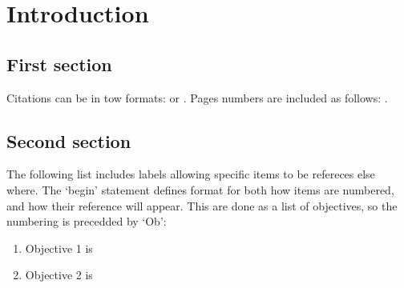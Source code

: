 \chapter{Introduction}
\ifpdf
    \graphicspath{{Introduction/IntroductionFigs/PNG/}{Introduction/IntroductionFigs/PDF/}{Introduction/IntroductionFigs/}}
\else
    \graphicspath{{Introduction/IntroductionFigs/EPS/}{Introduction/IntroductionFigs/}}
\fi

\section{First section}

Citations can be in tow formats: \citep{Mislevy2012} or \citep{Cassidy2011}. Pages numbers are included as follows: \citep[p. 214]{Pascarella2005}. 

\section{Second section}
The following list includes labels allowing specific items to be refereces else where. The `begin' statement defines format for both how items are numbered, and how their reference will appear. This are done as a list of objectives, so the numbering is precedded by `Ob':
\begin{enumerate}[label=\emph{Ob\arabic{enumi}}.,ref=\emph{Ob\arabic{enumi}}]
\item Objective 1 is  \label{Item1}
\item Objective 2 is  \label{Item2}
\end{enumerate}











